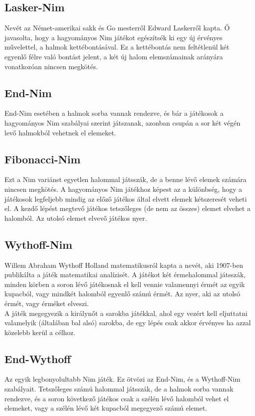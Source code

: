 \subsection{Lasker-Nim}
Nevét az Német-amerikai sakk és Go mesterről Edward Laskerről kapta. Ő javasolta, hogy a hagyományos Nim játékot egészítsék ki egy új érvényes művelettel, a halmok kettébontásával. Ez a kettébontás nem feltétlenül két egyenlő félre való bontást jelent, a két új halom elemszámainak arányára vonatkozóan nincsen megkötés.

\subsection{End-Nim}
End-Nim esetében a halmok sorba vannak rendezve, és bár a játékosok a hagyományos Nim szabályai szerint játszanak, azonban csupán a sor két végén levő halmokból vehetnek el elemeket.

\subsection{Fibonacci-Nim}
Ezt a Nim variánst egyetlen halommal játsszák, de a benne lévő elemek számára nincsen megkötés. A hagyományos Nim játékhoz képest az a különbség, hogy a játékosok legfeljebb mindig az előző játékos által elvett elemek kétszeresét veheti el. A kezdő lépést megtevő játékos tetszőleges (de nem az összes) elemet elvehet a halomból. Az utolsó elemet elvevő játékos nyer.

\subsection{Wythoff-Nim}
Willem Abraham Wythoff Holland matematikusról kapta a nevét, aki 1907-ben publikálta a játék matematikai analízisét. A játékot két érmehalommal játsszák, minden körben a soron lévő játékosnak el kell vennie valamennyi érmét az egyik kupacból, vagy mindkét halomból egyenlő számú érmét. Az nyer, aki az utolsó érmét, vagy érméket elveszi. \\
A játék megegyezik a királynőt a sarokba játékkal, ahol egy vezért kell eljuttatni valamelyik (általában bal alsó) sarokba, de egy lépés csak akkor érvényes ha azzal közelebb kerül a célhoz.

\subsection{End-Wythoff}
Az egyik legbonyolultabb Nim játék. Ez ötvözi az End-Nim, és a Wythoff-Nim szabályait. Tetszőleges számú halommal játsszák, de a halmok sorba vannak rendezve, és a soron következő játékos csak a szélén lévő halomból vehet el elemeket, vagy a szélén lévő két kupacból megegyező számú elemet.

